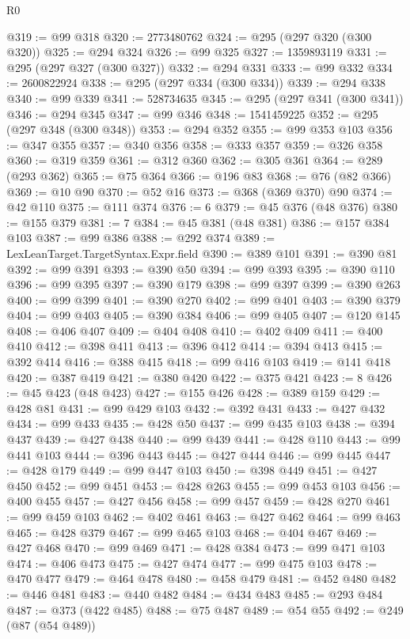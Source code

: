 \begin{lexlean}{R0}
\begin{coremodule}
@319 := @99 @318
@320 := 2773480762
@324 := @295 (@297 @320 (@300 @320))
@325 := @294 @324
@326 := @99 @325
@327 := 1359893119
@331 := @295 (@297 @327 (@300 @327))
@332 := @294 @331
@333 := @99 @332
@334 := 2600822924
@338 := @295 (@297 @334 (@300 @334))
@339 := @294 @338
@340 := @99 @339
@341 := 528734635
@345 := @295 (@297 @341 (@300 @341))
@346 := @294 @345
@347 := @99 @346
@348 := 1541459225
@352 := @295 (@297 @348 (@300 @348))
@353 := @294 @352
@355 := @99 @353 @103
@356 := @347 @355
@357 := @340 @356
@358 := @333 @357
@359 := @326 @358
@360 := @319 @359
@361 := @312 @360
@362 := @305 @361
@364 := @289 (@293 @362)
@365 := @75 @364
@366 := @196 @83
@368 := @76 (@82 @366)
@369 := @10 @90
@370 := @52 @16
@373 := @368 (@369 @370) @90
@374 := @42 @110
@375 := @111 @374
@376 := 6
@379 := @45 @376 (@48 @376)
@380 := @155 @379
@381 := 7
@384 := @45 @381 (@48 @381)
@386 := @157 @384 @103
@387 := @99 @386
@388 := @292 @374
@389 := LexLeanTarget.TargetSyntax.Expr.field
@390 := @389 @101
@391 := @390 @81
@392 := @99 @391
@393 := @390 @50
@394 := @99 @393
@395 := @390 @110
@396 := @99 @395
@397 := @390 @179
@398 := @99 @397
@399 := @390 @263
@400 := @99 @399
@401 := @390 @270
@402 := @99 @401
@403 := @390 @379
@404 := @99 @403
@405 := @390 @384
@406 := @99 @405
@407 := @120 @145
@408 := @406 @407
@409 := @404 @408
@410 := @402 @409
@411 := @400 @410
@412 := @398 @411
@413 := @396 @412
@414 := @394 @413
@415 := @392 @414
@416 := @388 @415
@418 := @99 @416 @103
@419 := @141 @418
@420 := @387 @419
@421 := @380 @420
@422 := @375 @421
@423 := 8
@426 := @45 @423 (@48 @423)
@427 := @155 @426
@428 := @389 @159
@429 := @428 @81
@431 := @99 @429 @103
@432 := @392 @431
@433 := @427 @432
@434 := @99 @433
@435 := @428 @50
@437 := @99 @435 @103
@438 := @394 @437
@439 := @427 @438
@440 := @99 @439
@441 := @428 @110
@443 := @99 @441 @103
@444 := @396 @443
@445 := @427 @444
@446 := @99 @445
@447 := @428 @179
@449 := @99 @447 @103
@450 := @398 @449
@451 := @427 @450
@452 := @99 @451
@453 := @428 @263
@455 := @99 @453 @103
@456 := @400 @455
@457 := @427 @456
@458 := @99 @457
@459 := @428 @270
@461 := @99 @459 @103
@462 := @402 @461
@463 := @427 @462
@464 := @99 @463
@465 := @428 @379
@467 := @99 @465 @103
@468 := @404 @467
@469 := @427 @468
@470 := @99 @469
@471 := @428 @384
@473 := @99 @471 @103
@474 := @406 @473
@475 := @427 @474
@477 := @99 @475 @103
@478 := @470 @477
@479 := @464 @478
@480 := @458 @479
@481 := @452 @480
@482 := @446 @481
@483 := @440 @482
@484 := @434 @483
@485 := @293 @484
@487 := @373 (@422 @485)
@488 := @75 @487
@489 := @54 @55
@492 := @249 (@87 (@54 @489))

\end{coremodule}
\end{lexlean}
